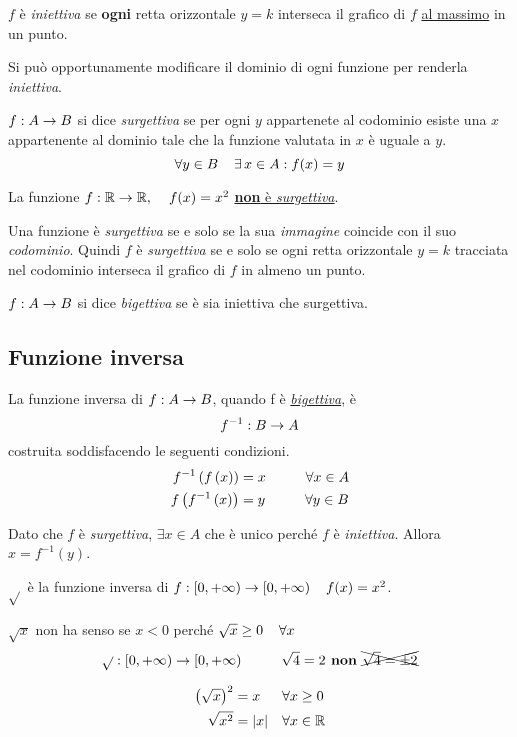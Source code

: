 \documentclass{article}
\begin{document}
\(f\) è \emph{iniettiva} se \textbf{ogni} retta orizzontale \(y = k\) interseca il grafico di \(f\) \underline{al massimo} in un punto.

Si può opportunamente modificare il dominio di ogni funzione per renderla \emph{iniettiva}.

\begin{dfn}
\(f: A \rightarrow B\) si dice \emph{surgettiva} se per ogni \(y\) appartenete al codominio esiste una \(x\) appartenente al dominio tale che la funzione valutata in \(x\) è uguale a \(y\).
\[\forall y \in B \hspace{.4cm} \exists\, x \in A : f(x) = y\]
\end{dfn}

\begin{eg}
La funzione \(f: \mathbb{R} \rightarrow \mathbb{R},\hspace{.4cm} f(x) = x^2\) \underline{\textbf{non} è \emph{surgettiva}}.
\end{eg}

Una funzione è \emph{surgettiva} se e solo se la sua \emph{immagine} coincide con il suo \emph{codominio}. Quindi \(f\) è \emph{surgettiva} se e solo se ogni retta orizzontale \(y = k\) tracciata nel codominio interseca il grafico di \(f\) in almeno un punto.

\begin{dfn}
\(f: A \rightarrow B\) si dice \emph{bigettiva} se è sia iniettiva che surgettiva.
\end{dfn}

\subsection{Funzione inversa}
La funzione inversa di \(f: A \rightarrow B\), quando f è \underline{\emph{bigettiva}}, è 
\[f^{-1}: B \rightarrow A\]
costruita soddisfacendo le seguenti condizioni.
\begin{align*}
    f^{-1}\left(f\left(x\right)\right) &= x \hspace{1cm} \forall x \in A \\
    f\left(f^{-1}\left(x\right)\right) &= y \hspace{1cm} \forall y \in B
\end{align*}

\begin{dms}
Dato che \(f\) è \emph{surgettiva}, \(\exists x \in A\) che è unico perché \(f\) è \emph{iniettiva}. Allora \(x = f^{-1}(y)\).
\end{dms}
\begin{eg}
\(\sqrt{}\) è la funzione inversa di \(f: [0,+\infty) \rightarrow [0,+\infty) \hspace{.4cm} f(x) = x^2\).
\begin{nb}
\(\sqrt{x}\) non ha senso se \(x < 0\) perché \(\sqrt{x} \geq 0 \hspace{.4cm} \forall x\)
\[\sqrt{}: [0,+\infty) \rightarrow [0,+\infty) \hspace{1cm} \sqrt{4} = 2 \textbf{ non } \xcancel{\sqrt{4} = \pm 2}\]
\end{nb}
\begin{align*}
    \left(\sqrt{x}\right)^2 &= x  && \forall x \geq 0 \\
    \sqrt{x^2} &= \lvert x \rvert && \forall x \in \mathbb{R}
\end{align*}
\end{eg}
\end{document}
